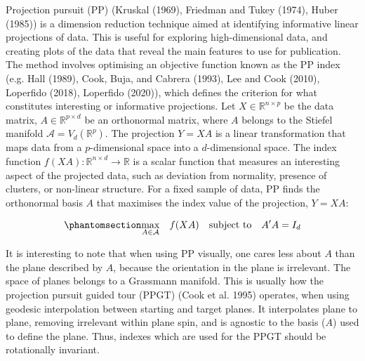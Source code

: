 \documentclass[
  12pt,
]{interact}
\theoremstyle{plain}
\begin{document}
Projection pursuit (PP) (Kruskal (1969), Friedman and Tukey (1974),
Huber (1985)) is a dimension reduction technique aimed at identifying
informative linear projections of data. This is useful for exploring
high-dimensional data, and creating plots of the data that reveal the
main features to use for publication. The method involves optimising an
objective function known as the PP index (e.g. Hall (1989), Cook, Buja,
and Cabrera (1993), Lee and Cook (2010), Loperfido (2018), Loperfido
(2020)), which defines the criterion for what constitutes interesting or
informative projections. Let \(X \in \mathbb{R}^{n\times p}\) be the
data matrix, \(A \in\mathbb{R}^{p \times d}\) be an orthonormal matrix,
where \(A\) belongs to the Stiefel manifold
\(\mathcal{A} = V_d(\mathbb{R}^p)\). The projection \(Y = XA\) is a
linear transformation that maps data from a \(p\)-dimensional space into
a \(d\)-dimensional space. The index function
\(f(XA): \mathbb{R}^{n \times d} \to \mathbb{R}\) is a scalar function
that measures an interesting aspect of the projected data, such as
deviation from normality, presence of clusters, or non-linear structure.
For a fixed sample of data, PP finds the orthonormal basis \(A\) that
maximises the index value of the projection, \(Y = XA\):

\begin{equation}\phantomsection\label{eq-optimization}{
\underset{A \in \mathcal{A}}{\max } \quad f(XA) \quad \text{subject to} \quad A'A = I_d
}\end{equation}

It is interesting to note that when using PP visually, one cares less
about \(A\) than the plane described by \(A\), because the orientation
in the plane is irrelevant. The space of planes belongs to a Grassmann
manifold. This is usually how the projection pursuit guided tour (PPGT)
(Cook et al. 1995) operates, when using geodesic interpolation between
starting and target planes. It interpolates plane to plane, removing
irrelevant within plane spin, and is agnostic to the basis (\(A\)) used
to define the plane. Thus, indexes which are used for the PPGT should be
rotationally invariant.
\end{document}
